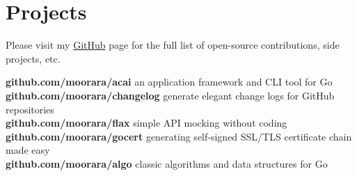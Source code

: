 \documentclass[]{cv-style}                     %
\begin{document}
\section{Projects}

Please visit my \href{http://github.com/moorara}{GitHub} page for the full list of open-source contributions, side projects, etc.

\textbf{github.com/moorara/acai} an application framework and CLI tool for Go  \\
\textbf{github.com/moorara/changelog} generate elegant change logs for GitHub repositories  \\
\textbf{github.com/moorara/flax} simple API mocking without coding \\
\textbf{github.com/moorara/gocert} generating self-signed SSL/TLS certificate chain made easy \\
\textbf{github.com/moorara/algo} classic algorithms and data structures for Go \\

\begin{entrylist}



\end{entrylist}



\end{document}
